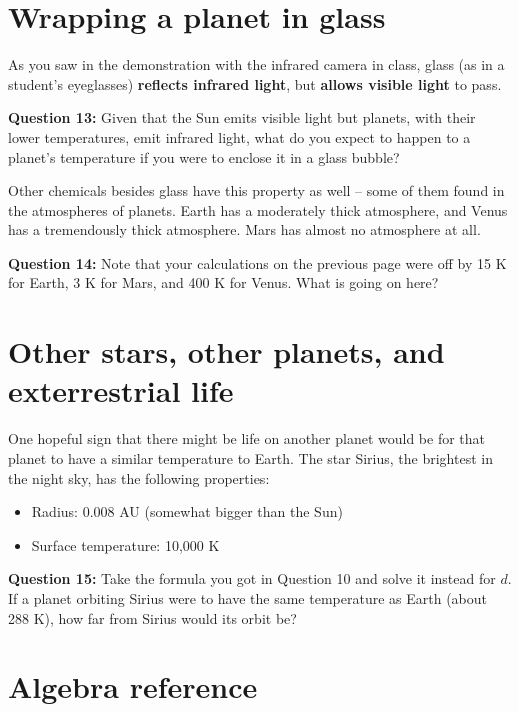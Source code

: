\documentclass[11pt]{article}
\def\BI{\begin{itemize}}
\def\EI{\end{itemize}}
\begin{document}
\section*{Wrapping a planet in glass}

As you saw in the demonstration with the infrared camera in class, glass (as in a student's eyeglasses) {\bf reflects infrared light}, but {\bf allows visible light} to pass.

{\bf Question 13:} 
Given that the Sun emits visible light but planets, with their lower temperatures, emit infrared light, what do you expect to happen to a planet's temperature if you were to
enclose it in a glass bubble? 

\vspace{1.5in}
\hrulefill
\bigskip

Other chemicals besides glass have this property as well -- some of them found in the atmospheres of planets. Earth has a moderately thick atmosphere, and Venus has a tremendously thick
atmosphere. Mars has almost no atmosphere at all.

{\bf Question 14:}  Note that your calculations on the previous page were off by 15 K for Earth, 3 K for Mars, and 400 K for Venus. 
What is going on here? 

\vspace{1.8in}
\hrulefill
\bigskip


\newpage
\section*{Other stars, other planets, and exterrestrial life}

One hopeful sign that there might be life on another planet would be for that planet to have a similar temperature to Earth. The star Sirius, the brightest in the night sky, 
has the following properties:

\BI
\item Radius: 0.008 AU (somewhat bigger than the Sun)
\item Surface temperature: 10,000 K
\EI

{\bf Question 15:} Take the formula you got in Question 10 and solve it instead for $d$. If a planet orbiting Sirius were to have the same temperature as Earth (about 288 K), 
how far from Sirius would its orbit be?

\newpage
\section*{Algebra reference}
\end{document}
